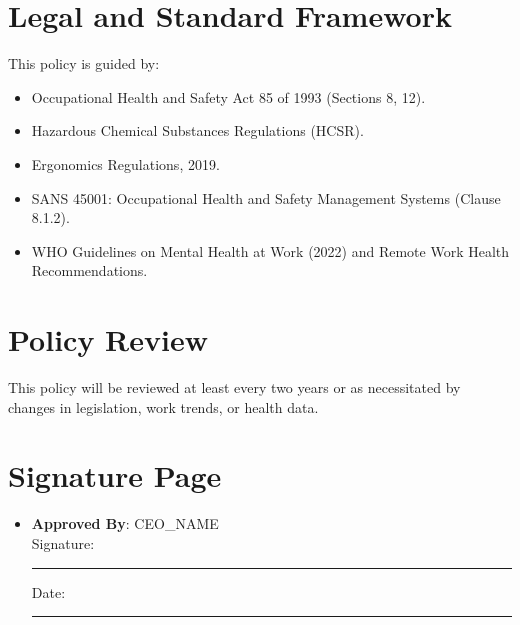 \documentclass[11pt]{article}
\begin{document}
\section{Legal and Standard Framework}
This policy is guided by:
\begin{itemize}
    \item Occupational Health and Safety Act 85 of 1993 (Sections 8, 12).
    \item Hazardous Chemical Substances Regulations (HCSR).
    \item Ergonomics Regulations, 2019.
    \item SANS 45001: Occupational Health and Safety Management Systems (Clause 8.1.2).
    \item WHO Guidelines on Mental Health at Work (2022) and Remote Work Health Recommendations.
\end{itemize}

\section{Policy Review}
This policy will be reviewed at least every two years or as necessitated by changes in legislation, work trends, or health data.

\section{Signature Page}
\begin{itemize}
  \clipperName \\
    Signature: \rule{5cm}{0.4pt} \quad Date: \rule{3cm}{0.4pt}
  \item \textbf{Approved By}: {{CEO_NAME}} \\
    Signature: \rule{5cm}{0.4pt} \quad Date: \rule{3cm}{0.4pt}
\end{itemize}
\end{document}
